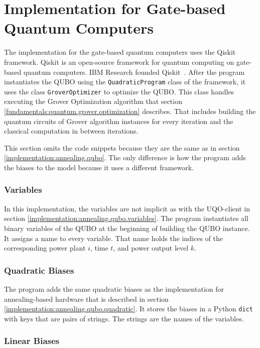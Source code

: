 \section{Implementation for Gate-based Quantum Computers}
\label{implement:gate.qubo}

The implementation for the gate-based quantum computers uses the Qiskit framework.
Qiskit is an open-source framework for quantum computing on gate-based quantum computers.
IBM Research founded Qiskit~\cite{QiskitWeb, QiskitGitHub}.
After the program instantiates the QUBO using the \texttt{QuadraticProgram} class of the framework, it uses the class \texttt{GroverOptimizer} to optimize the QUBO.
This class handles executing the Grover Optimization algorithm that section \ref{fundamentals:quantum.grover.optimization} describes.
That includes building the quantum circuits of Grover algorithm instances for every iteration and the classical computation in between iterations.

This section omits the code snippets because they are the same as in section \ref{implementation:annealing.qubo}.
The only difference is how the program adds the biases to the model because it uses a different framework.

\subsubsection{Variables}

In this implementation, the variables are not implicit as with the UQO-client in section \ref{implementation:annealing.qubo.variables}.
The program instantiates all binary variables of the QUBO at the beginning of building the QUBO instance.
It assigns a name to every variable.
That name holds the indices of the corresponding power plant $i$, time $t$, and power output level $k$.

\subsubsection{Quadratic Biases}

The program adds the same quadratic biases as the implementation for annealing-based hardware that is described in section \ref{implementation:annealing.qubo.quadratic}.
It stores the biases in a Python \texttt{dict} with keys that are pairs of strings.
The strings are the names of the variables.

\subsubsection{Linear Biases}

